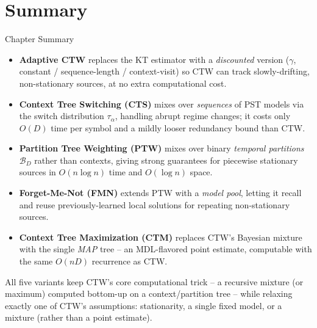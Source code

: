 \documentclass[aspectratio=169,10pt]{beamer}
\begin{document}
\section{Summary}
\begin{frame}{Chapter Summary}
  \begin{itemize}
    \item \textbf{Adaptive CTW} replaces the KT estimator with a
      \emph{discounted} version ($\gamma$, constant / sequence-length /
      context-visit) so CTW can track slowly-drifting, non-stationary
      sources, at no extra computational cost.
    \item \textbf{Context Tree Switching (CTS)} mixes over \emph{sequences}
      of PST models via the switch distribution $\tau_\alpha$, handling
      abrupt regime changes; it costs only $O(D)$ time per symbol and a
      mildly looser redundancy bound than CTW.
    \item \textbf{Partition Tree Weighting (PTW)} mixes over binary
      \emph{temporal partitions} $\mathcal{B}_D$ rather than contexts,
      giving strong guarantees for piecewise stationary sources in
      $O(n\log n)$ time and $O(\log n)$ space.
    \item \textbf{Forget-Me-Not (FMN)} extends PTW with a \emph{model pool},
      letting it recall and reuse previously-learned local solutions for
      repeating non-stationary sources.
    \item \textbf{Context Tree Maximization (CTM)} replaces CTW's Bayesian
      mixture with the single \emph{MAP} tree -- an MDL-flavored point
      estimate, computable with the same $O(nD)$ recurrence as CTW.
  \end{itemize}
  \bigskip
  \begin{center}
    \footnotesize All five variants keep CTW's core computational
    trick -- a recursive mixture (or maximum) computed bottom-up on a
    context/partition tree -- while relaxing exactly one of CTW's
    assumptions: stationarity, a single fixed model, or a mixture (rather
    than a point estimate).
  \end{center}
\end{frame}
\end{document}
